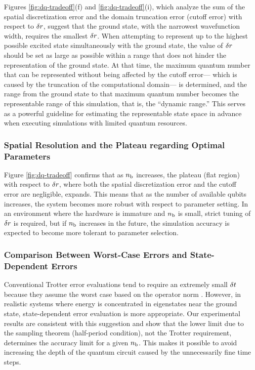 \documentclass[aip-draft.tex]{subfiles}
\begin{document}
Figures \ref{fig:dq-tradeoff}(f) and \ref{fig:dq-tradeoff}(i), which analyze the
sum of the spatial discretization error and the domain truncation error (cutoff
error) with respect to $\delta r$, suggest that the ground state, with the
narrowest wavefunction width, requires the smallest $\delta r$. When attempting
to represent up to the highest possible excited state simultaneously with the
ground state, the value of $\delta r$ should be set as large as possible within a
range that does not hinder the representation of the ground state. At that time,
the maximum quantum number that can be represented without being affected by the
cutoff error--- which is caused by the truncation of the computational domain---
is determined, and the range from the ground state to that maximum quantum
number becomes the representable range of this simulation, that is, the
``dynamic range.'' This serves as a powerful guideline for estimating the
representable state space in advance when executing simulations with limited
quantum resources.

\subsubsection{Spatial Resolution and the Plateau regarding Optimal Parameters}
Figure \ref{fig:dq-tradeoff} confirms that as $n_{\mathrm{b}}$ increases, the plateau (flat
region) with respect to $\delta r$, where both the spatial discretization error
and the cutoff error are negligible, expands. This means that as the number of
available qubits increases, the system becomes more robust with respect to
parameter setting. In an environment where the hardware is immature and $n_{\mathrm{b}}$ is
small, strict tuning of $\delta r$ is required, but if $n_{\mathrm{b}}$ increases in the
future, the simulation accuracy is expected to become more tolerant to
parameter selection.

\subsubsection{Comparison Between Worst-Case Errors and State-Dependent Errors}
Conventional Trotter error evaluations tend to require an extremely small
$\delta t$ because they assume the worst case based on the operator norm
\cite{Burgarth2024.PhysRevResearch.6.043155}. However, in realistic systems
where energy is concentrated in eigenstates near the ground state,
state-dependent error evaluation is more appropriate. Our experimental results
are consistent with this suggestion and show that the lower limit due to the
sampling theorem (half-period condition), not the Trotter requirement,
determines the accuracy limit for a given $n_{\mathrm{b}}$. This makes it possible to avoid
increasing the depth of the quantum circuit caused by the unnecessarily fine
time steps.
\end{document}
